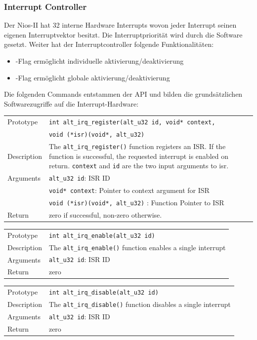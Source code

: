 \subsubsection{Interrupt Controller}
Der Nios-II hat 32 interne Hardware Interrupts wovon jeder Interrupt seinen eigenen Interruptvektor besitzt.  Die Interruptpriorität wird durch die Software gesetzt. Weiter hat der Interruptcontroller folgende Funktionalitäten:
\begin{itemize}
\item {}-Flag ermöglicht individuelle aktivierung/deaktivierung
\item {}-Flag ermöglicht globale aktivierung/deaktivierung
\end{itemize}
Die folgenden Commands entstammen der API und bilden die grundsätzlichen Softwarezugriffe auf die Interrupt-Hardware:
\begin{table}[h]
\begin{tabular}[t]{p{} p{} }
Prototype & \lstinline$int alt_irq_register(alt_u32 id, void* context, $ \\
& \lstinline$void (*isr)(void*, alt_u32)$  \\
Description & The \lstinline$alt_irq_register()$ function registers an ISR. If the function is successful, the requested interrupt is enabled on return. \lstinline$context$ and \lstinline$id$ are the two input arguments to isr.\\
Arguments & \lstinline$alt_u32 id$:	ISR ID \\
 & \lstinline$void* context$: 	Pointer to context argument for ISR\\
 & \lstinline$void (*isr)(void*, alt_u32)$ : Function Pointer to ISR\\
Return &  zero if successful, non-zero otherwise. 
\end{tabular}
\end{table}
\begin{table}[h!]
\begin{tabular}[t]{p{} p{} }
Prototype & \lstinline$int alt_irq_enable(alt_u32 id)$ \\
Description & The \lstinline$alt_irq_enable()$ function enables a single interrupt\\
Arguments & \lstinline$alt_u32 id$:	ISR ID \\
Return &  zero
\end{tabular}
\end{table}
\begin{table}[h!]
\begin{tabular}[t]{p{} p{} }
Prototype & \lstinline$int alt_irq_disable(alt_u32 id)$ \\
Description & The \lstinline$alt_irq_disable()$ function disables a single interrupt\\
Arguments & \lstinline$alt_u32 id$:	ISR ID \\
Return &  zero
\end{tabular}
\end{table}
